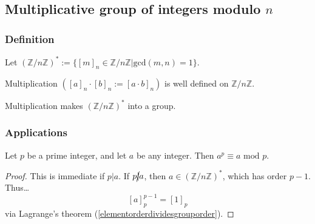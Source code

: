 \subsection{Multiplicative group of integers modulo $n$}\label{multiplicativegroupofintegersmodn}

\subsubsection{Definition}
Let $(\mathbb{Z} / n \mathbb{Z})^* := \{[m]_n \in \mathbb{Z} / n \mathbb{Z} | \textrm{gcd}(m,n)=1 \}.$

\begin{lemma}
Multiplication $([a]_n \cdot [b]_n := [a \cdot b]_n)$ is well defined on $\mathbb{Z} / n \mathbb{Z}$.
\end{lemma}

\begin{proposition}
Multiplication makes $(\mathbb{Z} / n \mathbb{Z})^*$ into a group.
\end{proposition}

\subsubsection{Applications}

\begin{theorem}
Let $p$ be a prime integer, and let $a$ be any integer. Then $a^p \equiv a \textrm{ mod } p$.
\end{theorem}

\begin{proof}
This is immediate if $p | a$. If $p \cancel{|} a$, then $a \in (\mathbb{Z} / n \mathbb{Z})^*$, which has order $p-1$. Thus\dots
$$[a]_p^{p-1} = [1]_p$$
via Lagrange's theorem (\ref{elementorderdividesgrouporder}).
\end{proof}


